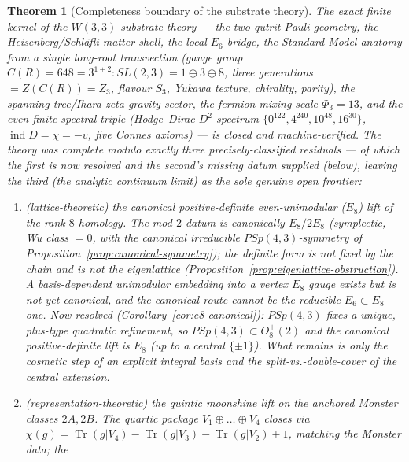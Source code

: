 \documentclass[12pt,a4paper]{article}
\def\mathbb#1{#1}%
\def\mathrm#1{#1}%
\def\mathbf#1{#1}%
\def\textbf#1{#1}%
\def\Phi#1{Phi#1}%
\newtheorem{theorem}{Theorem}[section]
\theoremstyle{definition}
\begin{document}
\begin{theorem}[Completeness boundary of the substrate theory]
\label{thm:completeness-boundary}
The exact finite kernel of the $W(3,3)$ substrate theory --- the two-qutrit
Pauli geometry, the Heisenberg/Schl\"afli matter shell, the local $E_6$
bridge, the Standard-Model anatomy from a single long-root transvection
(gauge group $C(R)=648=3^{1+2}{:}\mathrm{SL}(2,3)=\mathbf1\oplus\mathbf3
\oplus\mathbf8$, three generations $=Z(C(R))=\mathbb Z_3$, flavour
$S_3$, Yukawa texture, chirality, parity), the spanning-tree/Ihara-zeta
gravity sector, the fermion-mixing scale $\Phi_3=13$, and the even finite
spectral triple (Hodge--Dirac $D^2$-spectrum $\{0^{122},4^{240},10^{48},
16^{30}\}$, $\operatorname{ind}D=\chi=-v$, five Connes axioms) --- is closed
and machine-verified. The theory was complete modulo exactly three
precisely-classified residuals --- of which the first is now resolved and the
second's missing datum supplied (below), leaving the third (the analytic
continuum limit) as the sole genuine open frontier:
\begin{enumerate}[label=(R\arabic*)]
  \item \textup{(lattice-theoretic)} the canonical positive-definite
        even-unimodular ($E_8$) lift of the rank-$8$ homology. The mod-$2$
        datum is canonically $E_8/2E_8$ (symplectic, Wu class $=0$, with the
        canonical irreducible $\mathrm{PSp}(4,3)$-symmetry of
        Proposition~\ref{prop:canonical-symmetry}); the definite form is not
        fixed by the chain and is not the eigenlattice
        (Proposition~\ref{prop:eigenlattice-obstruction}). A basis-dependent
        unimodular embedding into a vertex $E_8$ gauge exists but is not yet
        canonical, and the canonical route cannot be the reducible
        $E_6\subset E_8$ one. \textbf{Now resolved}
        (Corollary~\ref{cor:e8-canonical}): $\mathrm{PSp}(4,3)$ fixes a unique,
        plus-type quadratic refinement, so $\mathrm{PSp}(4,3)\subset O_8^+(2)$
        and the canonical positive-definite lift is $E_8$ (up to a central
        $\{\pm1\}$). What remains is only the cosmetic step of an explicit
        integral basis and the split-vs.-double-cover of the central
        extension.
  \item \textup{(representation-theoretic)} the quintic moonshine lift on the
        anchored Monster classes $2A,2B$. The quartic package
        $V_1\oplus\dots\oplus V_4$ closes via
        $\chi(g)=\operatorname{Tr}(g|V_4)-\operatorname{Tr}(g|V_3)
        -\operatorname{Tr}(g|V_2)+1$, matching the Monster data; the

\end{enumerate}
\end{theorem}
\end{document}
